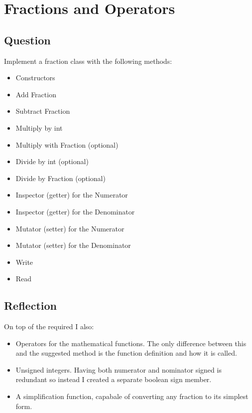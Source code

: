 \section{Fractions and Operators}
    \subsection*{Question}
        Implement a fraction class with the following methods:
        \begin{itemize}
            \item Constructors
            \item Add Fraction
            \item Subtract Fraction
            \item Multiply by int
            \item Multiply with Fraction (optional)
            \item Divide by int (optional)
            \item Divide by Fraction (optional)
            \item Inspector (getter) for the Numerator
            \item Inspector (getter) for the Denominator
            \item Mutator (setter) for the Numerator
            \item Mutator (setter) for the Denominator
            \item Write
            \item Read
        \end{itemize}

    \subsection*{Reflection}
        On top of the required I also:
        \begin{itemize}
            \item Operators for the mathematical functions. 
                The only difference between this and the suggested method is 
                the function definition and how it is called.
            \item Unsigned integers. Having both numerator and nominator signed
                is redundant so instead I created a separate boolean sign member.
            \item A simplification function, capabale of converting any fraction to
                its simplest form.
        \end{itemize}
    
